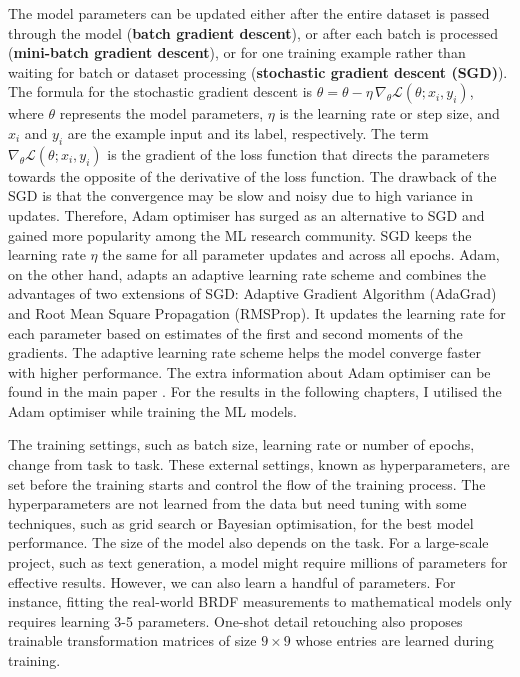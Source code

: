 The model parameters can be updated either after the entire dataset is passed through the model (\textbf{batch gradient descent}), or after each batch is processed (\textbf{mini-batch gradient descent}), or for one training example rather than waiting for batch or dataset processing (\textbf{stochastic gradient descent (\gls{SGD})}). The formula for the stochastic gradient descent is $\theta = \theta - \eta \, \nabla_{\theta} \mathcal{L}(\theta; x_i, y_i)$, where $\theta$ represents the model parameters, $\eta$ is the learning rate or step size, and $x_i$ and $y_i$ are the example input and its label, respectively. The term $\nabla_{\theta} \mathcal{L}(\theta; x_i, y_i)$ is the gradient of the loss function that directs the parameters towards the opposite of the derivative of the loss function. The drawback of the SGD is that the convergence may be slow and noisy due to high variance in updates. Therefore, Adam optimiser has surged as an alternative to SGD and gained more popularity among the ML research community. SGD keeps the learning rate $\eta$ the same for all parameter updates and across all epochs. Adam, on the other hand,  adapts an adaptive learning rate scheme and combines the advantages of two extensions of SGD: Adaptive Gradient Algorithm (AdaGrad) and Root Mean Square Propagation (RMSProp). It updates the learning rate for each parameter based on estimates of the first and second moments of the gradients. The adaptive learning rate scheme helps the model converge faster with higher performance. The extra information about Adam optimiser can be found in the main paper \cite{kingma2014adam}. For the results in the following chapters, I utilised the Adam optimiser while training the ML models.

The training settings, such as batch size, learning rate or number of epochs, change from task to task. These external settings, known as hyperparameters, are set before the training starts and control the flow of the training process. The hyperparameters are not learned from the data but need tuning with some techniques, such as grid search or Bayesian optimisation, for the best model performance. The size of the model also depends on the task. For a large-scale project, such as text generation, a model might require millions of parameters for effective results. However, we can also learn a handful of parameters. For instance, fitting the real-world BRDF measurements to mathematical models only requires learning 3-5 parameters. One-shot detail retouching also proposes trainable transformation matrices of size $9 \times 9$ whose entries are learned during training.

